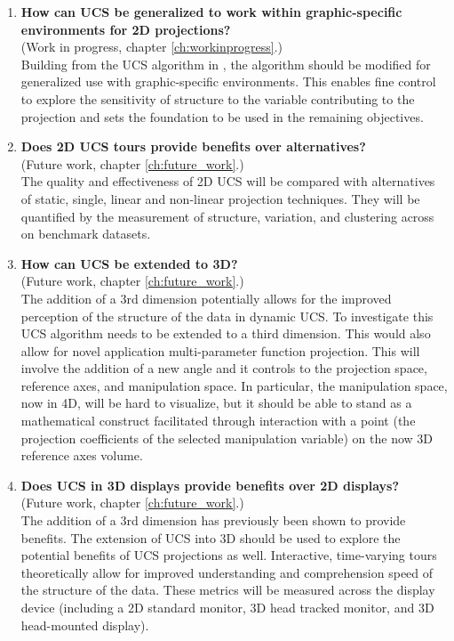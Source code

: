 \documentclass{monashthesis}
\begin{document}
\begin{enumerate}
\def\labelenumi{\arabic{enumi}.}
\item
  \textbf{How can UCS be generalized to work within graphic-specific
  environments for 2D projections?}\\
  (Work in progress, chapter \ref{ch:workinprogress}.)\\
  Building from the UCS algorithm in \textcite{cook_manual_1997}, the
  algorithm should be modified for generalized use with graphic-specific
  environments. This enables fine control to explore the sensitivity of
  structure to the variable contributing to the projection and sets the
  foundation to be used in the remaining objectives.
\item
  \textbf{Does 2D UCS tours provide benefits over alternatives?}\\
  (Future work, chapter \ref{ch:future_work}.)\\
  The quality and effectiveness of 2D UCS will be compared with
  alternatives of static, single, linear and non-linear projection
  techniques. They will be quantified by the measurement of structure,
  variation, and clustering across on benchmark datasets.
\item
  \textbf{How can UCS be extended to 3D?}\\
  (Future work, chapter \ref{ch:future_work}.)\\
  The addition of a 3rd dimension potentially allows for the improved
  perception of the structure of the data in dynamic UCS. To investigate
  this UCS algorithm needs to be extended to a third dimension. This
  would also allow for novel application multi-parameter function
  projection. This will involve the addition of a new angle and it
  controls to the projection space, reference axes, and manipulation
  space. In particular, the manipulation space, now in 4D, will be hard
  to visualize, but it should be able to stand as a mathematical
  construct facilitated through interaction with a point (the projection
  coefficients of the selected manipulation variable) on the now 3D
  reference axes volume.
\item
  \textbf{Does UCS in 3D displays provide benefits over 2D displays?}\\
  (Future work, chapter \ref{ch:future_work}.)\\
  The addition of a 3rd dimension has previously been shown to provide
  benefits. The extension of UCS into 3D should be used to explore the
  potential benefits of UCS projections as well. Interactive,
  time-varying tours theoretically allow for improved understanding and
  comprehension speed of the structure of the data. These metrics will
  be measured across the display device (including a 2D standard
  monitor, 3D head tracked monitor, and 3D head-mounted display).
\end{enumerate}
\end{document}
